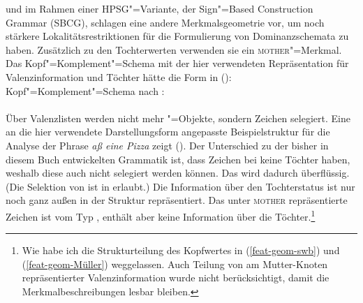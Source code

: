 \mbox{}\citet*[475--489]{SWB2003a} und \citet{Sag2007a,Sag2012a} im Rahmen einer HPSG"=Variante, der
Sign"=Based
Construction Grammar (SBCG), schlagen eine andere Merkmalsgeometrie vor, um noch
stärkere
Lokalitätsrestriktionen für die Formulierung von Dominanzschemata zu haben. Zusätzlich zu den Tochterwerten
verwenden sie ein \textsc{mother}"=Merkmal. Das Kopf"=Komplement"=Schema mit der hier
verwendeten Repräsentation für Valenzinformation und Töchter hätte die Form in ():
\ea
Kopf"=Komplement"=Schema nach \citet*[481]{SWB2003a}:\\
 \impl\\
\z
Über Valenzlisten werden nicht mehr "=Objekte, sondern Zeichen selegiert. Eine an die hier verwendete
Darstellungsform angepasste Beispielstruktur für die Analyse der Phrase \emph{aß eine Pizza} zeigt
().
Der Unterschied zu der bisher in diesem Buch entwickelten Grammatik ist, 
dass Zeichen bei \citeauthor*{SWB2003a} keine Töchter haben, weshalb
diese auch nicht selegiert werden können. Das \synsemm wird dadurch überflüssig. (Die Selektion von
\phon ist in  erlaubt.) Die Information
über den Tochterstatus ist nur noch ganz außen in der Struktur repräsentiert. Das unter
\textsc{mother} repräsentierte Zeichen ist vom Typ , enthält aber keine Information
über die Töchter.\footnote{
   Wie \citeauthor*{SWB2003a} habe ich die Strukturteilung des Kopfwertes in (\ref{feat-geom-swb})
   und (\ref{feat-geom-Müller})  weggelassen. Auch Teilung
   von am Mutter-Knoten repräsentierter Valenzinformation wurde nicht berücksichtigt, damit die
   Merkmalbeschreibungen lesbar bleiben.%
}
\ea
\label{feat-geom-swb}
